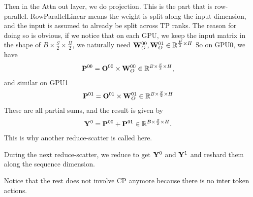 \documentclass[11pt]{article}  %
\begin{document}
Then in the Attn out layer, we do projection. 
This is the part that is row-parallel.
RowParallelLinear means the weight is split along the input dimension, and the input is assumed to already be split across TP ranks.
The reason for doing so is obvious, if we notice that on each GPU, we keep the input matrix in the shape of $B \times \frac{S}{2} \times \frac{H}{2}$, we naturally need $\mathbf{W}_O^{00}, \mathbf{W}_O^{01} \in \mathbb{R}^{\frac{H}{2} \times H}$ 
So on GPU0, we have 
\begin{align*}
  \mathbf{P}^{00} = \mathbf{O}^{00} \times \mathbf{W}_O^{00} \in \mathbb{R}^{B \times \frac{S}{2} \times H},
\end{align*}
and similar on GPU1 
\begin{align*}
  \mathbf{P}^{01} = \mathbf{O}^{01} \times \mathbf{W}_O^{01} \in \mathbb{R}^{B \times \frac{S}{2} \times H}
\end{align*}
These are all partial sums, and the result is given by 
\begin{align*}
  \mathbf{Y}^0 = \mathbf{P}^{00} + \mathbf{P}^{01} \in \mathbb{R}^{B \times \frac{S}{2} \times H}.
\end{align*}
This is why another reduce-scatter is called here.

During the next reduce-scatter, we reduce to get $\mathbf{Y}^0$ and $\mathbf{Y}^1$ and reshard them along the sequence dimension.

Notice that the rest does not involve CP anymore because there is no inter token actions.
\end{document}
